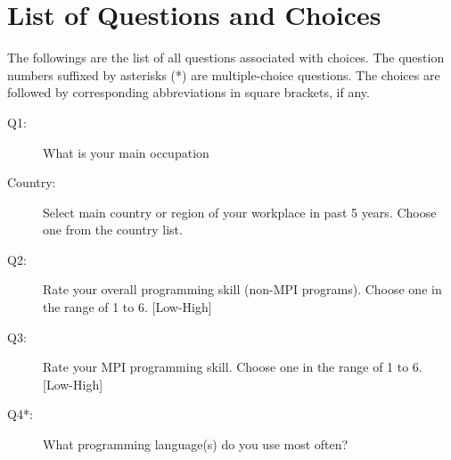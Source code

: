 \documentclass[preprint,5p,times]{elsarticle}
\begin{document}
{


\appendix
\section{List of Questions and Choices}
\label{app:questions}

The followings are the list of all questions associated with
choices. The question numbers suffixed by asterisks (*) are
multiple-choice questions. The choices are followed by corresponding
abbreviations in square brackets, if any.
\vspace{2mm}
{\footnotesize
  \begin{description}
  \item[Q1:] What is your main occupation
  \item[Country:] \hspace{3mm}Select main country or region of your workplace in past 5 years.
    Choose one from the country list.
  \item[Q2:] Rate your overall programming skill (non-MPI programs).
    Choose one in the range of 1 to 6. [Low-High]
  \item[Q3:] Rate your MPI programming skill.
    Choose one in the range of 1 to 6. [Low-High]
  \item[Q4*:] What programming language(s) do you use most often?
\end{description}}}
\end{document}
